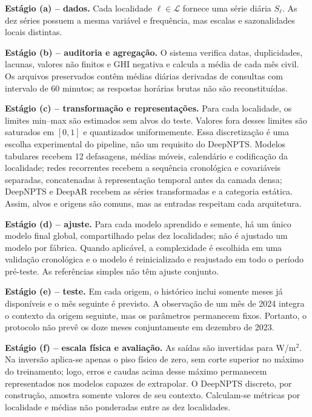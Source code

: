 \documentclass[10pt,conference,a4paper]{IEEEtran}
\begin{document}
\noindent\textbf{Estágio (a) -- dados.} Cada localidade $\ell\in\mathcal L$
fornece uma série diária $S_\ell$. As dez séries possuem a mesma variável e
frequência, mas escalas e sazonalidades locais distintas.

\noindent\textbf{Estágio (b) -- auditoria e agregação.} O sistema verifica
datas, duplicidades, lacunas, valores não finitos e GHI negativa e calcula a
média de cada mês civil. Os arquivos preservados contêm médias diárias
derivadas de consultas com intervalo de 60 minutos; as respostas horárias
brutas não são reconstituídas.

\noindent\textbf{Estágio (c) -- transformação e representações.} Para cada
localidade, os limites min--max são estimados sem alvos do teste. Valores fora
desses limites são saturados em $[0,1]$ e quantizados uniformemente. Essa
discretização é uma escolha experimental do pipeline, não um requisito do
DeepNPTS. Modelos tabulares recebem 12 defasagens, médias móveis, calendário e
codificação da localidade; redes recorrentes recebem a sequência cronológica e
covariáveis separadas, concatenadas à representação temporal antes da camada
densa; DeepNPTS e DeepAR recebem as séries transformadas e a categoria estática.
Assim, alvos e origens são comuns, mas as entradas respeitam cada arquitetura.

\noindent\textbf{Estágio (d) -- ajuste.} Para cada modelo aprendido e semente,
há um único modelo final global, compartilhado pelas dez localidades; não é
ajustado um modelo por fábrica. Quando aplicável, a complexidade é escolhida em
uma validação cronológica e o modelo é reinicializado e reajustado em todo o
período pré-teste. As referências simples não têm ajuste conjunto.

\noindent\textbf{Estágio (e) -- teste.} Em cada origem, o histórico inclui
somente meses já disponíveis e o mês seguinte é previsto. A observação de um
mês de 2024 integra o contexto da origem seguinte, mas os parâmetros permanecem
fixos. Portanto, o protocolo não prevê os doze meses conjuntamente em dezembro
de 2023.

\noindent\textbf{Estágio (f) -- escala física e avaliação.} As saídas são
invertidas para W/m$^2$. Na inversão aplica-se apenas o piso físico de zero,
sem corte superior no máximo do treinamento; logo, erros e caudas acima desse
máximo permanecem representados nos modelos capazes de extrapolar. O DeepNPTS
discreto, por construção, amostra somente valores de seu contexto. Calculam-se
métricas por localidade e médias não ponderadas entre as dez localidades.
\end{document}
